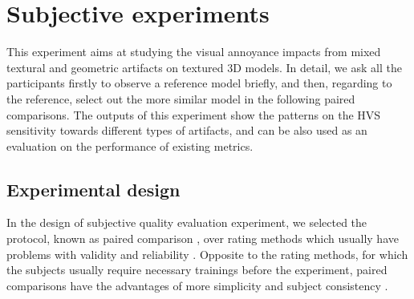\section{Subjective experiments}
This experiment aims at studying the visual annoyance impacts from mixed textural and geometric artifacts on textured 3D models. In detail, we ask all the participants firstly to observe a reference model briefly, and then, regarding to the reference, select out the more similar model in the following paired comparisons. The outputs of this experiment show the patterns on the HVS sensitivity towards different types of artifacts, and can be also used as an evaluation on the performance of existing metrics.
\subsection{Experimental design}
In the design of subjective quality evaluation experiment, we selected the protocol, known as paired comparison \cite{Lee_2011}, over rating methods which usually have problems with validity and reliability \cite{Govindarajulu_1992}. Opposite to the rating methods, for which the subjects usually require necessary trainings before the experiment, paired comparisons have the advantages of more simplicity and subject consistency \cite{Wills_2009}. 

